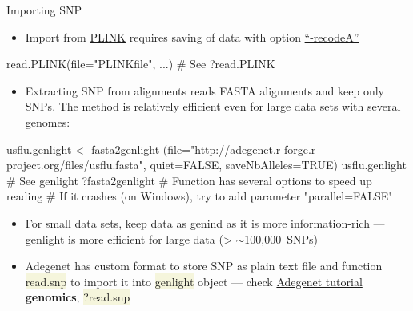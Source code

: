 \documentclass[compress, ucs, xelatex, 11pt, xcolor=svgnames, aspectratio=169,
	hyperref={
		bookmarks=true,
		unicode=true,
		colorlinks=true,
		pdftitle={Molecular data in R},
		plainpages=false,
		pdfauthor={Vojtech Zeisek},
		pdfsubject={Course about phylogeny and evolution in R},
		pdfcreator={XeLaTeX},
		pdfkeywords={R, evolution, phylogeny, molecular data},
		linkcolor=Crimson, %
		anchorcolor=Magenta, %
		citecolor=Magenta, %
		filecolor=Magenta, %
		menucolor=Magenta, %
		urlcolor=DodgerBlue, %
		pdftex},
	url={hyphens, lowtilde} %
	]{beamer}
\renewcommand{\texttt}[1]{\colorbox{Beige}{{\ttfamily #1}}}
\begin{document}
\begin{frame}[fragile]{Importing SNP}
	\begin{itemize}
		\item Import from \href{http://zzz.bwh.harvard.edu/plink/}{PLINK} requires saving of data with option \href{http://zzz.bwh.harvard.edu/plink/dataman.shtml#recode}{\enquote{-recodeA}}
	\end{itemize}
	\begin{spluscode}
    read.PLINK(file="PLINKfile", ...) # See ?read.PLINK
	\end{spluscode}
	\begin{itemize}
		\item Extracting SNP from alignments reads FASTA alignments and keep only SNPs. The method is relatively efficient even for large data sets with several genomes:
	\end{itemize}
	\begin{spluscode}
    usflu.genlight <- fasta2genlight
      (file="http://adegenet.r-forge.r-project.org/files/usflu.fasta",
      quiet=FALSE, saveNbAlleles=TRUE)
    usflu.genlight # See genlight
    ?fasta2genlight # Function has several options to speed up reading
    # If it crashes (on Windows), try to add parameter "parallel=FALSE"
	\end{spluscode}
	\begin{itemize}
		\item For small data sets, keep data as genind as it is more information-rich --- genlight is more efficient for large data (> $\sim$100,000~SNPs)
		\item Adegenet has custom format to store SNP as plain text file and function \texttt{read.snp} to import it into \texttt{genlight} object --- check \href{https://github.com/thibautjombart/adegenet/wiki/Tutorials}{Adegenet tutorial} \textbf{genomics}, \texttt{?read.snp}
	\end{itemize}
\end{frame}
\end{document}
